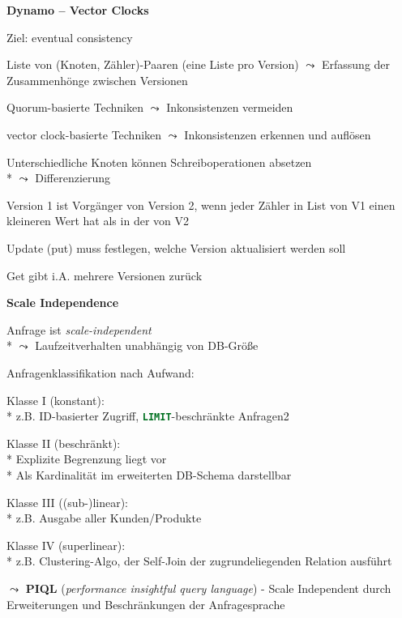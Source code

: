 \textbf{Dynamo -- Vector Clocks}
\begin{items}
	\item Ziel: eventual consistency
	\item Liste von (Knoten, Zähler)-Paaren (eine Liste pro Version) \( \leadsto \) Erfassung der Zusammenhönge zwischen Versionen
	\item Quorum-basierte Techniken \( \leadsto \) Inkonsistenzen vermeiden
	\item vector clock-basierte Techniken \( \leadsto \) Inkonsistenzen erkennen und auflösen
	\item Unterschiedliche Knoten können Schreiboperationen absetzen \\* \( \leadsto \) Differenzierung
	\item Version 1 ist Vorgänger von Version 2, wenn jeder Zähler in List von V1 einen kleineren Wert hat als in der von V2
	\item Update (put) muss festlegen, welche Version aktualisiert werden soll
	\item Get gibt i.A. mehrere Versionen zurück
\end{items}

\newpage

\textbf{Scale Independence}
\begin{items}
	\item Anfrage ist \emph{scale-independent}
		\\*
		\( \leadsto \) Laufzeitverhalten unabhängig von DB-Größe
	\item Anfragenklassifikation nach Aufwand:
	\begin{enumeration}
		\item Klasse I (konstant):
			\\*
			z.B. ID-basierter Zugriff, \lstinline[language=sql]{LIMIT}-beschränkte Anfragen2
		\item Klasse II (beschränkt):
			\\*
			Explizite Begrenzung liegt vor
			\\*
			Als Kardinalität im erweiterten DB-Schema darstellbar
		\item Klasse III ((sub-)linear):
			\\*
			z.B. Ausgabe aller Kunden/Produkte
		\item Klasse IV (superlinear):
			\\*
			z.B. Clustering-Algo, der Self-Join der zugrundeliegenden Relation ausführt
	\end{enumeration}
	\item \( \leadsto \) \textbf{PIQL} (\emph{performance insightful query language}) - Scale Independent durch Erweiterungen und Beschränkungen der Anfragesprache
\end{items}

